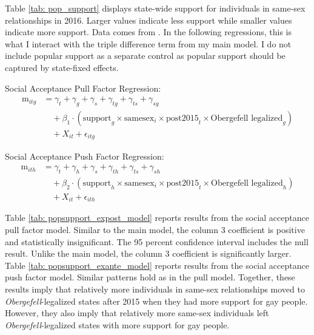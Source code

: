\documentclass[12pt,letterpaper]{article}
\begin{document}


Table \ref{tab: pop_support} displays state-wide support for individuals in same-sex relationships in 2016. Larger values indicate less support while smaller values indicate more support. Data comes from \citet{29}. In the following regressions, this is what I interact with the triple difference term from my main model. I do not include popular support as a separate control as popular support should be captured by state-fixed effects.

\hfill
\break
Social Acceptance Pull Factor Regression:
\begin{equation}
\begin{aligned}
\text{m}_{itg} &= \gamma_t + \gamma_g + \gamma_s + \gamma_{tg} + \gamma_{ts} + \gamma_{sg} \\
&\quad + \beta_1 \cdot (\text{support}_g \times \text{samesex}_i \times \text{post2015}_t \times \text{Obergefell legalized}_g) \\
&\quad + X_{it} + \epsilon_{itg}
\end{aligned}
\end{equation}

\hfill
\break
Social Acceptance Push Factor Regression:
\begin{equation}
\begin{aligned}
\text{m}_{ith} &= \gamma_t + \gamma_h + \gamma_s + \gamma_{th} + \gamma_{ts} + \gamma_{sh} \\
&\quad + \beta_2 \cdot (\text{support}_h \times \text{samesex}_i \times \text{post2015}_t \times \text{Obergefell legalized}_h) \\
&\quad + X_{it} + \epsilon_{ith}
\end{aligned}
\end{equation}

Table \ref{tab: popsupport_expost_model} reports results from the social acceptance pull factor model. Similar to the main model, the column 3 coefficient is positive and statistically insignificant. The 95 percent confidence interval includes the null result. Unlike the main model, the column 3 coefficient is significantly larger. Table \ref{tab: popsupport_exante_model} reports results from the social acceptance push factor model. Similar patterns hold as in the pull model. Together, these results imply that relatively more individuals in same-sex relationships moved to \textit{Obergefell}-legalized states after 2015 when they had more support for gay people. However, they also imply that relatively more same-sex individuals left \textit{Obergefell}-legalized states with more support for gay people. 
\end{document}
